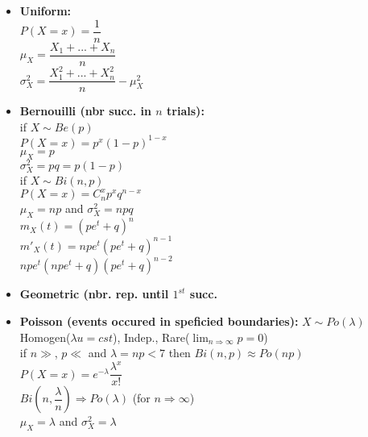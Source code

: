 \documentclass[a4paper, 10pt, landscape]{article}
\begin{document}
\begin{multicols*}{4}
\begin{itemize}
\item{\textbf{Uniform:} \\ \textbullet $P(X=x) = \dfrac{1}{n}$ \\ \textbullet $\mu_X = \dfrac{X_1 + ... + X_n}{n}$ \\ \textbullet $\sigma_X^2 = \dfrac{X_1^2 + ... + X_n^2}{n} - \mu_X^2$}
\item{\textbf{Bernouilli (nbr succ. in $n$ trials):} \\ if $X\sim Be(p)$ \\ \textbullet $P(X=x)=p^x(1-p)^{1-x}$ \\ \textbullet $\mu_X = p$ \\ \textbullet $\sigma_X^2 = pq = p(1-p)$ \\ if $X\sim Bi(n,p)$ \\ \textbullet $P(X=x)=C_n^xp^xq^{n-x}$ \\ \textbullet $\mu_X = np$ and $\sigma_X^2=npq$ \\ \textbullet $m_X(t)=(pe^t+q)^n$ \\ \textbullet $m'_X(t) = npe^t(pe^t+q)^{n-1}$ \\ \textbullet $npe^t(npe^t+q)(pe^t+q)^{n-2}$}
\item{\textbf{Geometric (nbr. rep. until $1^{st}$ succ.}}
\item{\textbf{Poisson (events occured in speficied boundaries):} $X\sim Po(\lambda)$ \\ \textbullet Homogen($\lambda u = cst$), Indep., Rare($\lim_{n\Rightarrow \infty} p =0$) \\ \textbullet if $n\gg$, $p\ll$ and $\lambda=np<7$ then $Bi(n,p)\approx Po(np)$ \\ \textbullet $P(X=x)=e^{-\lambda}\dfrac{\lambda^x}{x!}$ \\ \textbullet $Bi(n,\dfrac{\lambda}{n}) \Rightarrow Po(\lambda)$ (for $n \Rightarrow \infty$) \\ \textbullet $\mu_X=\lambda$ and $\sigma_X^2=\lambda$}
\end{itemize}



\end{multicols*}
\end{document}
